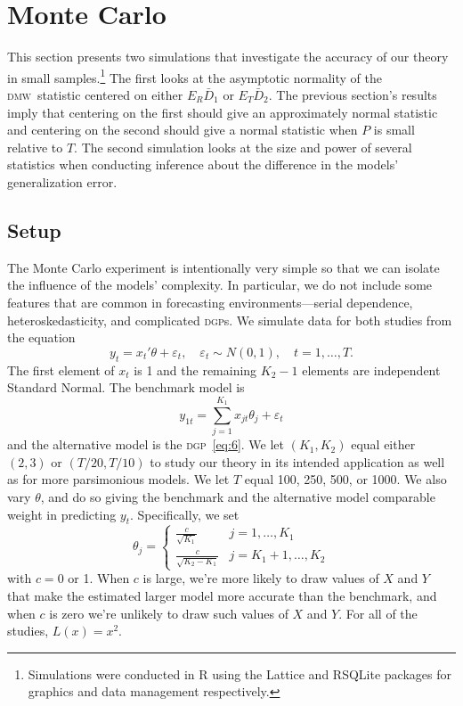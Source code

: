 \documentclass[11pt]{article}
\newcommand{\dmw}{\textsc{dmw}}
\newcommand{\dgp}{\textsc{dgp}}
\begin{document}
\section{Monte Carlo}\label{sec:mc}
\newcommand{\thetanorm}{\ensuremath{\lvert \theta \rvert_2}} This
section presents two simulations that investigate the accuracy of our
theory in small samples.\footnote{Simulations were conducted in R
  \citep{Rde:10} using the Lattice \citep{Sar:10} and RSQLite
  \citep{Jam:10} packages for graphics and data management
  respectively.}  The first looks at the asymptotic normality of the
\dmw\ statistic centered on either $E_R \bar D_1$ or $E_T \bar D_2$.
The previous section's results imply that centering on the first
should give an approximately normal statistic and centering on the
second should give a normal statistic when $P$ is small relative to
$T$.  The second simulation looks at the size and power of several
statistics when conducting inference about the difference in the
models' generalization error.

\subsection{Setup}\label{sec:simulation-design}
The Monte Carlo experiment is intentionally very simple so that we can
isolate the influence of the models' complexity.  In particular, we do
not include some features that are common in forecasting
environments---serial dependence, heteroskedasticity, and complicated
\dgp s.  We simulate data for both studies from the equation
\begin{equation}\label{eq:6}
  y_t = x_t'\theta + \varepsilon_t,\quad \varepsilon_t \sim N(0,1),
  \quad t=1,\dots,T.
\end{equation}
The first element of $x_t$ is 1 and the remaining $K_2-1$ elements are
independent Standard Normal.  The benchmark model is
\begin{equation}
  \label{eq:1}
  y_{1t} = \sum_{j=1}^{K_1} x_{jt}\theta_j + \varepsilon_t
\end{equation}
and the alternative model is the \dgp\ \eqref{eq:6}.  We let
$(K_1,K_2)$ equal either $(2,3)$ or $(T/20,T/10)$ to study our theory
in its intended application as well as for more parsimonious models.
We let $T$ equal 100, 250, 500, or 1000.  We also vary $\theta$, and do 
so giving the benchmark and the alternative model comparable weight in
predicting $y_t$.  Specifically, we set
\begin{equation*}
  \theta_j = 
\begin{cases} \frac{c}{\sqrt{K_1}} & j = 1,\dots,K_1 \\
\frac{c}{\sqrt{K_2 - K_1}} & j = K_1 + 1,\dots,K_2 \end{cases}  
\end{equation*}
with $c=0$ or 1.  When $c$ is large, we're more likely to draw
values of $X$ and $Y$ that make the estimated larger model more
accurate than the benchmark, and when $c$ is zero we're unlikely to
draw such values of $X$ and $Y$.  For all of the studies, $L(x) =
x^2$.  
\end{document}
